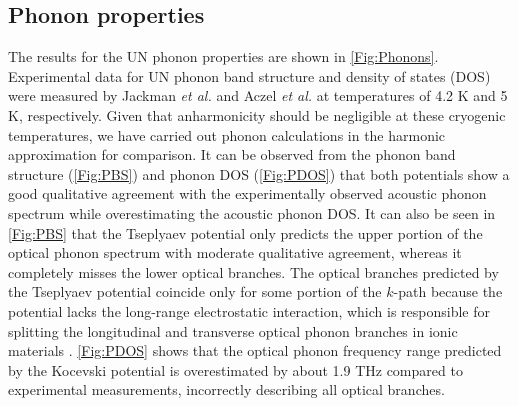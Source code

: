\documentclass[preprint, 12pt]{elsarticle}
\begin{document}
\subsection{Phonon properties}
\label{sub:phonon}

The results for the UN phonon properties are shown in \cref{Fig:Phonons}. Experimental data for UN phonon band structure and density of states (DOS) were measured by Jackman \textit{et al.} \cite{Jackman1986} and Aczel \textit{et al.} \cite{Aczel2012} at temperatures of 4.2 K and 5 K, respectively. Given that anharmonicity should be negligible at these cryogenic temperatures, we have carried out phonon calculations in the harmonic approximation for comparison. It can be observed from the phonon band structure (\cref{Fig:PBS}) and phonon DOS (\cref{Fig:PDOS}) that both potentials show a good qualitative agreement with the experimentally observed acoustic phonon spectrum while overestimating the acoustic phonon DOS. It can also be seen in \cref{Fig:PBS} that the Tseplyaev potential only predicts the upper portion of the optical phonon spectrum with moderate qualitative agreement, whereas it completely misses the lower optical branches. The optical branches predicted by the Tseplyaev potential coincide only for some portion of the $k$-path because the potential lacks the long-range electrostatic interaction, which is responsible for splitting the longitudinal and transverse optical phonon branches in ionic materials \cite{Zhou2009}. \cref{Fig:PDOS} shows that the optical phonon frequency range predicted by the Kocevski potential is overestimated by about 1.9 THz compared to experimental measurements, incorrectly describing all optical branches.
\end{document}
